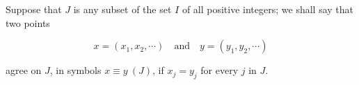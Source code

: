 Suppose that $J$ is any subset of the set $I$ of all positive integers; we shall say that two points

$$x = (x_1, x_2, \cdots) \quad \text{and} \quad y = (y_1, y_2, \cdots)$$

agree on $J$, in symbols $x \equiv y \ (J)$, if $x_j = y_j$ for every $j$ in $J$.
